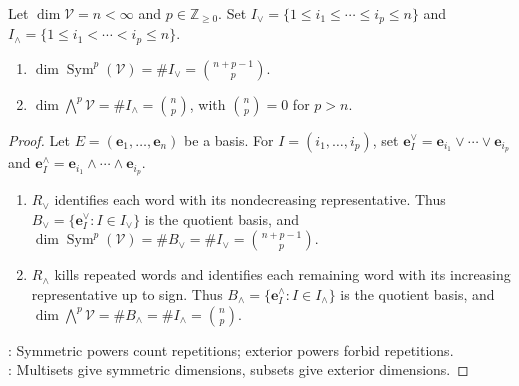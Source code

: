 \begin{theorem} \label{thm:symmetric-exterior-dimensions} \\
Let $\dim\mathcal{V}=n<\infty$ and $p\in\mathbb{Z}_{\geq0}$. Set $I_{\vee}=\{1\leq i_1\leq\cdots\leq i_p\leq n\}$ and $I_{\wedge}=\{1\leq i_1<\cdots<i_p\leq n\}$.
\begin{enumerate}[label=(\roman*)]
\setlength{\itemsep}{0pt}
\item $\dim\operatorname{Sym}^{p}(\mathcal{V})=\#I_{\vee}=\binom{n+p-1}{p}$.
\item $\dim\bigwedge^{p}\mathcal{V}=\#I_{\wedge}=\binom{n}{p}$, with $\binom{n}{p}=0$ for $p>n$.
\end{enumerate}
\begin{proof}
Let $E=(\mathbf{e}_1,\ldots,\mathbf{e}_n)$ be a basis. For $I=(i_1,\ldots,i_p)$, set $\mathbf{e}_{I}^{\vee}=\mathbf{e}_{i_1}\vee\cdots\vee\mathbf{e}_{i_p}$ and $\mathbf{e}_{I}^{\wedge}=\mathbf{e}_{i_1}\wedge\cdots\wedge\mathbf{e}_{i_p}$.
\begin{enumerate}[label=(\roman*)]
\setlength{\itemsep}{0pt}
\item
$R_{\vee}$ identifies each word with its nondecreasing representative. Thus $B_{\vee}=\{\mathbf{e}_{I}^{\vee}:I\in I_{\vee}\}$ is the quotient basis, and $\dim\operatorname{Sym}^{p}(\mathcal{V})=\#B_{\vee}=\#I_{\vee}=\binom{n+p-1}{p}$.
\item
$R_{\wedge}$ kills repeated words and identifies each remaining word with its increasing representative up to sign. Thus $B_{\wedge}=\{\mathbf{e}_{I}^{\wedge}:I\in I_{\wedge}\}$ is the quotient basis, and $\dim\bigwedge^{p}\mathcal{V}=\#B_{\wedge}=\#I_{\wedge}=\binom{n}{p}$.
\end{enumerate}
: Symmetric powers count repetitions; exterior powers forbid repetitions.\\
: Multisets give symmetric dimensions, subsets give exterior dimensions.
\end{proof}
\end{theorem}

